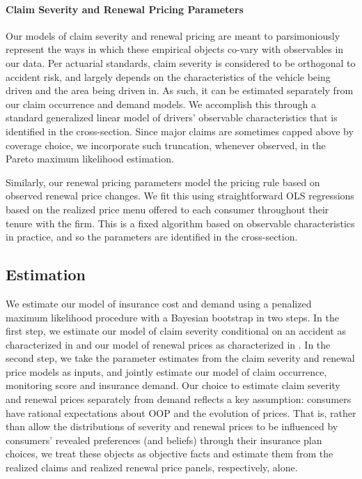 \paragraph{Claim Severity and Renewal Pricing Parameters} Our models of claim severity and renewal pricing are meant to parsimoniously represent the ways in which these empirical objects co-vary with observables in our data. Per actuarial standards, claim severity is considered to be orthogonal to accident risk, and largely depends on the characteristics of the vehicle being driven and the area being driven in. As such, it can be estimated separately from our claim occurrence and demand models. We accomplish this through a standard generalized linear model of drivers' observable characteristics that is identified in the cross-section. Since major claims are sometimes capped above by coverage choice, we incorporate such truncation, whenever observed, in the Pareto maximum likelihood estimation.

Similarly, our renewal pricing parameters model the pricing rule based on observed renewal price changes. We fit this using straightforward OLS regressions based on the realized price menu offered to each consumer throughout their tenure with the firm.  This is a fixed algorithm based on observable characteristics in practice, and so the parameters are identified in the cross-section.


\subsection{Estimation\label{sec:model_estimation}}
We estimate our model of insurance cost and demand using a penalized maximum likelihood procedure with a Bayesian bootstrap in two steps. In the first step, we estimate our model of claim severity conditional on an accident as characterized in  and our model of renewal prices as characterized in . In the second step, we take the parameter estimates from the claim severity and renewal price models as inputs, and jointly estimate our model of claim occurrence, monitoring score and insurance demand. Our choice to estimate claim severity and renewal prices separately from demand reflects a key assumption: consumers have rational expectations about OOP and the evolution of prices. That is, rather than allow the distributions of severity and renewal prices to be influenced by consumers' revealed preferences (and beliefs) through their insurance plan choices, we treat these objects as objective facts and estimate them from the realized claims and realized renewal price panels, respectively, alone.

